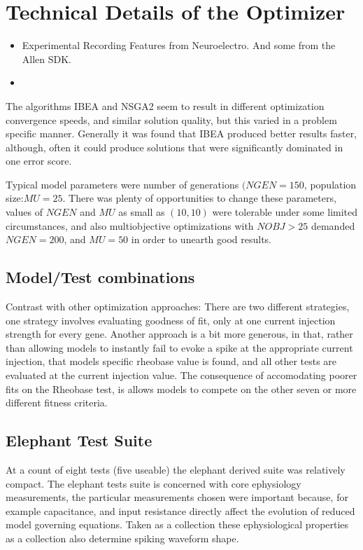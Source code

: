 \section*{Technical Details of the Optimizer}
\begin{itemize}
\item Experimental Recording Features from Neuroelectro. And some from the Allen SDK.
\item 
\end{itemize}


The algorithms IBEA and NSGA2 seem to result in different optimization convergence speeds, and similar solution quality, but this varied in a problem specific manner. Generally it was found that IBEA produced better results faster, although, often it could produce solutions that were significantly dominated in one error score.

Typical model parameters were number of generations $(NGEN=150$, population size:$MU=25$. There was plenty of opportunities to change these parameters,  values of $NGEN$ and $MU$ as small as $(10,10)$ were tolerable under some limited circumstances, and also multiobjective optimizations with $NOBJ>25$ demanded $NGEN=200$, and $MU=50$ in order to unearth good results.


\subsection{Model/Test combinations}

Contrast with other optimization approaches:
There are two different strategies, one strategy involves evaluating goodness of fit, only at one current injection strength for every gene. Another approach is a bit more generous, in that, rather than allowing models to instantly fail to evoke a spike at the appropriate current injection, that models specific rheobase value is found, and all other tests are evaluated at the current injection value. The consequence of accomodating poorer fits on the Rheobase test, is allows models to compete on the other seven or more different fitness criteria.

\subsection{Elephant Test Suite}
At a count of eight tests (five useable) the elephant derived suite was relatively compact. The elephant tests suite is concerned with core ephysiology measurements, the particular measurements chosen were important because, for example capacitance, and input resistance directly affect the evolution of reduced model governing equations. Taken as a collection these ephysiological properties as a collection also determine spiking waveform shape. 

